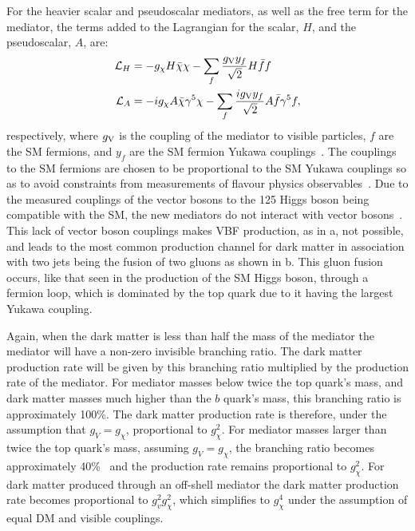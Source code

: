 For the heavier scalar and pseudoscalar mediators, as well as the free term for the mediator, the terms added to the Lagrangian for the scalar, $H$, and the pseudoscalar, $A$, are:
\begin{align}
  \mathcal{L}_{H}&=-g_{\chi}H\bar{\chi}\chi-\sum_{f}\frac{g_{\rm{V}}y_{f}}{\sqrt{2}}H\bar{f}f\\
  \mathcal{L}_{A}&=-ig_{\chi}A\bar{\chi}\gamma^{5}\chi-\sum_{f}\frac{ig_{\rm{V}}y_{f}}{\sqrt{2}}A\bar{f}\gamma^{5}f,\\
\end{align}
respectively, where $g_{\rm{V}}$ is the coupling of the mediator to visible particles, $f$ are the \ac{SM} fermions, and $y_{f}$ are the \ac{SM} fermion Yukawa couplings~\cite{PhysRevD.91.015017}. The couplings to the \ac{SM} fermions are chosen to be proportional to the \ac{SM} Yukawa couplings so as to avoid constraints from measurements of flavour physics observables~\cite{D'Ambrosio2002155}. Due to the measured couplings of the vector bosons to the 125 \GeV Higgs boson being compatible with the \ac{SM}, the new mediators do not interact with vector bosons~\cite{CMS-PAS-HIG-15-002}. This lack of vector boson couplings makes \ac{VBF} production, as in a, not possible, and leads to the most common production channel for dark matter in association with two jets being the fusion of two gluons as shown in b. This gluon fusion occurs, like that seen in the production of the \ac{SM} Higgs boson, through a fermion loop, which is dominated by the top quark due to it having the largest Yukawa coupling.

Again, when the dark matter is less than half the mass of the mediator the mediator will have a non-zero invisible branching ratio. The dark matter production rate will be given by this branching ratio multiplied by the production rate of the mediator. For mediator masses below twice the top quark's mass, and dark matter masses much higher than the $b$ quark's mass, this branching ratio is approximately 100\%. The dark matter production rate is therefore, under the assumption that $g_{V}=g_{\chi}$, proportional to $g_{\chi}^{2}$. For mediator masses larger than twice the top quark's mass, assuming $g_{V}=g_{\chi}$, the branching ratio becomes approximately 40\%~\cite{ourdmpaper} and the production rate remains proportional to $g_{\chi}^{2}$. For dark matter produced through an off-shell mediator the dark matter production rate becomes proportional to $g_{v}^{2}g_{\chi}^{2}$, which simplifies to $g_{\chi}^{4}$ under the assumption of equal \ac{DM} and visible couplings.


